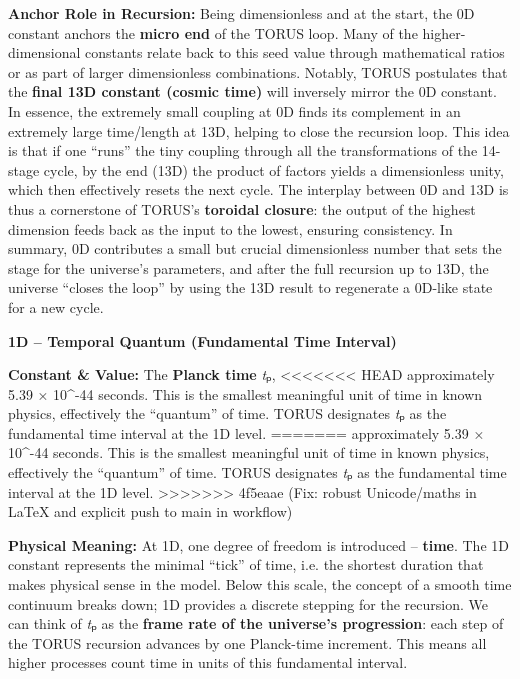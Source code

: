 \documentclass[]{article}
\begin{document}
\textbf{Anchor Role in Recursion:} Being dimensionless and at the start,
the 0D constant anchors the \textbf{micro end} of the TORUS loop. Many
of the higher-dimensional constants relate back to this seed value
through mathematical ratios or as part of larger dimensionless
combinations. Notably, TORUS postulates that the \textbf{final 13D
constant (cosmic time)} will inversely mirror the 0D constant​. In
essence, the extremely small coupling at 0D finds its complement in an
extremely large time/length at 13D, helping to close the recursion loop.
This idea is that if one ``runs'' the tiny coupling through all the
transformations of the 14-stage cycle, by the end (13D) the product of
factors yields a dimensionless unity, which then effectively resets the
next cycle​. The interplay between 0D and 13D is thus a cornerstone of
TORUS's \textbf{toroidal closure}: the output of the highest dimension
feeds back as the input to the lowest, ensuring consistency. In summary,
0D contributes a small but crucial dimensionless number that sets the
stage for the universe's parameters, and after the full recursion up to
13D, the universe ``closes the loop'' by using the 13D result to
regenerate a 0D-like state for a new cycle​.

\textbf{1D -- Temporal Quantum (Fundamental Time Interval)}

\textbf{Constant \& Value:} The \textbf{Planck time} \emph{t}ₚ,
<<<<<<< HEAD
approximately 5.39 × 10\^{}-44 seconds\hspace{0pt}. This is the smallest
meaningful unit of time in known physics, effectively the ``quantum'' of
time. TORUS designates \emph{t}ₚ as the fundamental time interval at the
1D level.
=======
approximately 5.39 × 10\^{}-44 seconds​. This is the smallest meaningful
unit of time in known physics, effectively the ``quantum'' of time.
TORUS designates \emph{t}ₚ as the fundamental time interval at the 1D
level.
>>>>>>> 4f5eaae (Fix: robust Unicode/maths in LaTeX and explicit push to main in workflow)

\textbf{Physical Meaning:} At 1D, one degree of freedom is introduced --
\textbf{time}. The 1D constant represents the minimal ``tick'' of time,
i.e. the shortest duration that makes physical sense in the model​.
Below this scale, the concept of a smooth time continuum breaks down; 1D
provides a discrete stepping for the recursion. We can think of
\emph{t}ₚ as the \textbf{frame rate of the universe's progression}​:
each step of the TORUS recursion advances by one Planck-time increment.
This means all higher processes count time in units of this fundamental
interval.
\end{document}
